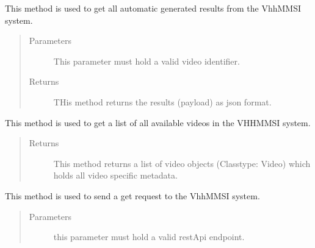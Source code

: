 \documentclass[letterpaper,10pt,english,openany,oneside]{sphinxmanual}
\begin{document}
\begin{fulllineitems}
\begin{fulllineitems}
\label{\detokenize{VhhRestApi:VhhRestApi.VhhRestApi.getAutomaticResults}}
This method is used to get all automatic generated results from the VhhMMSI system.
\begin{quote}\begin{description}
\item[{Parameters}] \leavevmode
{} \textendash{} This parameter must hold a valid video identifier.

\item[{Returns}] \leavevmode
THis method returns the results (payload) as json format.

\end{description}\end{quote}

\end{fulllineitems}


\begin{fulllineitems}
\label{\detokenize{VhhRestApi:VhhRestApi.VhhRestApi.getListofVideos}}
This method is used to get a list of all available videos in the VHH\sphinxhyphen{}MMSI system.
\begin{quote}\begin{description}
\item[{Returns}] \leavevmode
This method returns a list of video objects (Class\sphinxhyphen{}type: Video) which holds all video specific meta\sphinxhyphen{}data.

\end{description}\end{quote}

\end{fulllineitems}


\begin{fulllineitems}
\label{\detokenize{VhhRestApi:VhhRestApi.VhhRestApi.getRequest}}
This method is used to send a get request to the Vhh\sphinxhyphen{}MMSI system.
\begin{quote}\begin{description}
\item[{Parameters}] \leavevmode
{} \textendash{} this parameter must hold a valid restApi endpoint.


\end{description}
\end{quote}
\end{fulllineitems}
\end{fulllineitems}
\end{document}
